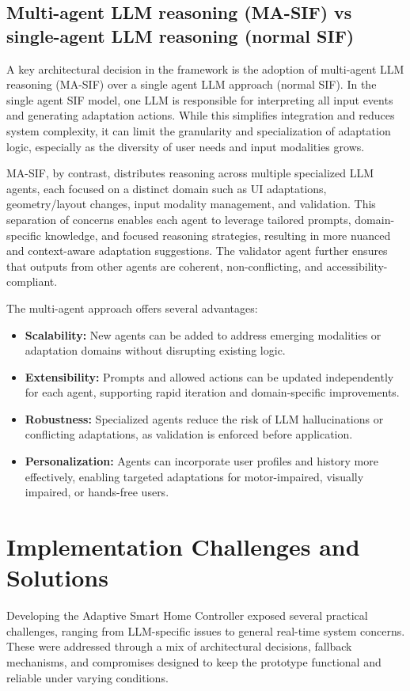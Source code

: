 \documentclass[openany]{book}
\begin{document}
\subsection{Multi-agent LLM reasoning (MA-SIF) vs single-agent LLM reasoning (normal SIF)}
A key architectural decision in the framework is the adoption of multi-agent LLM reasoning (MA-SIF) over a single agent LLM approach (normal SIF). In the single agent SIF model, one LLM is responsible for interpreting all input events and generating adaptation actions. While this simplifies integration and reduces system complexity, it can limit the granularity and specialization of adaptation logic, especially as the diversity of user needs and input modalities grows.

MA-SIF, by contrast, distributes reasoning across multiple specialized LLM agents, each focused on a distinct domain such as UI adaptations, geometry/layout changes, input modality management, and validation. This separation of concerns enables each agent to leverage tailored prompts, domain-specific knowledge, and focused reasoning strategies, resulting in more nuanced and context-aware adaptation suggestions. The validator agent further ensures that outputs from other agents are coherent, non-conflicting, and accessibility-compliant.

The multi-agent approach offers several advantages: \begin{itemize} \item \textbf{Scalability:} New agents can be added to address emerging modalities or adaptation domains without disrupting existing logic. \item \textbf{Extensibility:} Prompts and allowed actions can be updated independently for each agent, supporting rapid iteration and domain-specific improvements. \item \textbf{Robustness:} Specialized agents reduce the risk of LLM hallucinations or conflicting adaptations, as validation is enforced before application. \item \textbf{Personalization:} Agents can incorporate user profiles and history more effectively, enabling targeted adaptations for motor-impaired, visually impaired, or hands-free users. \end{itemize}

\section{Implementation Challenges and Solutions}
Developing the Adaptive Smart Home Controller exposed several practical challenges, ranging from LLM-specific issues to general real-time system concerns. These were addressed through a mix of architectural decisions, fallback mechanisms, and compromises designed to keep the prototype functional and reliable under varying conditions.
\end{document}

